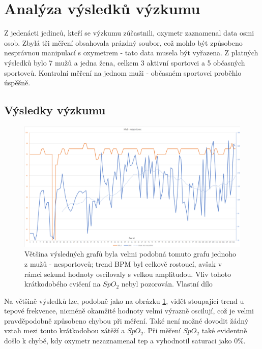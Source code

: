 \section{Analýza výsledků výzkumu}
Z jedenácti jedinců, kteří se výzkumu zúčastnili, oxymetr zaznamenal data osmi osob. Zbylá tři měření obsahovala prázdný soubor, což mohlo být způsobeno nesprávnou manipulací s oxymetrem - tato data musela být vyřazena. Z platných výsledků bylo 7 mužů a jedna žena, celkem 3 aktivní sportovci a 5 občasných sportovců. Kontrolní měření na jednom muži - občasném sportovci proběhlo úspěšně.
\subsection{Výsledky výzkumu}
\begin{figure}[ht]
\centering
  \includegraphics[scale=0.35, center]{Kapitoly/Prakticka/Obrazky/SpatnyGraf.png}
  \caption [Graf typického muže - nesportovce]{Většina výsledných grafů byla velmi podobná tomuto grafu jednoho z mužů - nesportovců; trend BPM byl celkově rostoucí, avšak v rámci sekund hodnoty oscilovaly s velkou amplitudou. Vliv tohoto krátkodobého cvičení na $SpO_2$ nebyl pozorován. Vlastní dílo}
  \label{fig:Spatny}
\end{figure}
Na většině výsledků lze, podobně jako na obrázku \ref{fig:Spatny}, vidět stoupající trend u tepové frekvence, nicméně okamžité hodnoty velmi výrazně oscilují, což je velmi pravděpodobně způsobeno chybou při měření. Také není možné dovodit žádný vztah mezi touto krátkodobou zátěží a $SpO_2$. Při měření $SpO_2$ také evidentně došlo k chybě, kdy oxymetr nezaznamenal tep a vyhodnotil saturaci jako 0\%.
